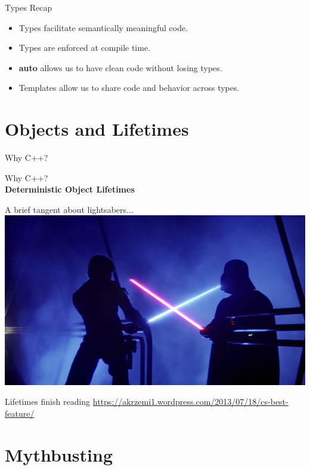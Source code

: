 \documentclass{beamer}
\begin{document}
	\begin{frame}{Types Recap}
		\begin{itemize}
			\item Types facilitate semantically meaningful code.
			\item Types are enforced at compile time.
			\item \textbf{auto} allows us to have clean code without losing types.
			\item Templates allow us to share code and behavior across types.
		\end{itemize}
	\end{frame}
	
	\section{Objects and Lifetimes}
	
	\begin{frame}
		\begin{center}
			Why C++?
		\end{center}
	\end{frame}
	
	\begin{frame}
		\begin{center}
			Why C++?\\
			\textbf{Deterministic Object Lifetimes}
		\end{center}
	\end{frame}
	
	\begin{frame}
		\begin{center}
			A brief tangent about lightsabers...
			\includegraphics[width=\textwidth]{images/lightsabers}
		\end{center}
	\end{frame}
	
	\begin{frame}{Lifetimes}
		finish reading \url{https://akrzemi1.wordpress.com/2013/07/18/cs-best-feature/}
	\end{frame}
	
	\section{Mythbusting}
	
	\begin{frame}
		
	\end{frame}
\end{document}
